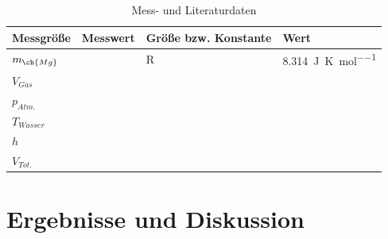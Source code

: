 \documentclass{article}
\begin{document}
      \begin{table}[H]
        \centering
        \caption[Mess- und Literaturdaten, Quelle: Autor]{Mess- und Literaturdaten}
        \label{tab:Messdaten}
          \begin{tabular}{@{}ll|ll@{}}
            \toprule
             Messgröße & Messwert & Größe bzw. Konstante & Wert \\ \midrule
             $m_{\ch{Mg}}$ &  & R & \SI[mode=text]{8.314}{\joule\per\kelvin\per\mol} \\
             $V_{Gas}$ &  &  &  \\
             $p_{Atm.}$ &  &  &  \\
             $T_{Wasser}$ &  &  &  \\
             $h$ &  &  &  \\
             $V_{Tot.}$ &  &  &  \\ \bottomrule
          \end{tabular}
       \end{table}      
      
  \section{Ergebnisse und Diskussion}
  
  \pagebreak
  
  \listofreactions
  \printbibliography[title=Literaturverzeichnis]
  \listoffigures
  \listoftables
  
\end{document}
